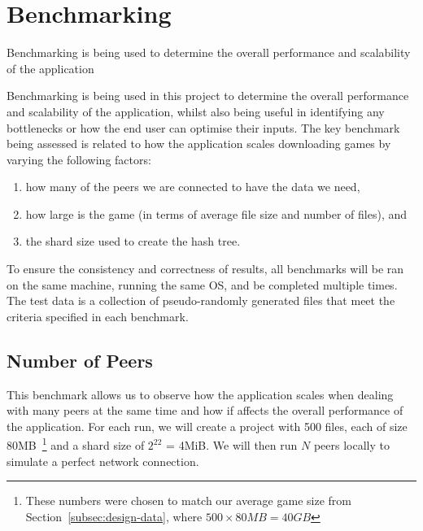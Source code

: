 
\newpage
\section{Benchmarking}\label{sec:benchmark}

Benchmarking is being used to determine the overall performance and scalability of the application

Benchmarking is being used in this project to determine the overall performance and scalability of the application, whilst also being useful in identifying any bottlenecks or how the end user can optimise their inputs. The key benchmark being assessed is related to how the application scales downloading games by varying the following factors:

\begin{enumerate}
  \item how many of the peers we are connected to have the data we need,
  \item how large is the game (in terms of average file size and number of files), and
  \item the shard size used to create the hash tree.
\end{enumerate}

\vspace{2mm}\noindent
To ensure the consistency and correctness of results, all benchmarks will be ran on the same machine, running the same OS, and be completed multiple times. The test data is a collection of pseudo-randomly generated files that meet the criteria specified in each benchmark.

\subsection*{Number of Peers}

This benchmark allows us to observe how the application scales when dealing with many peers at the same time and how if affects the overall performance of the application.
\x
For each run, we will create a project with 500 files, each of size 80MB~\footnote{These numbers were chosen to match our average game size from Section~\ref{subsec:design-data}, where $500\times 80MB = 40GB$} and a shard size of $2^{22}$ = 4MiB. We will then run $N$ peers locally to simulate a perfect network connection.

